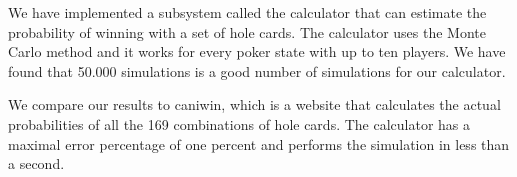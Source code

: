 We have implemented a subsystem called the calculator that can estimate the probability of winning with a set of hole cards. The calculator uses the Monte Carlo method and it works for every poker state with up to ten players. We have found that 50.000 simulations is a good number of simulations for our calculator. 

We compare our results to caniwin, which is a website that calculates the actual probabilities of all the 169 combinations of hole cards. The calculator has a maximal error percentage of one percent and performs the simulation in less than a second.